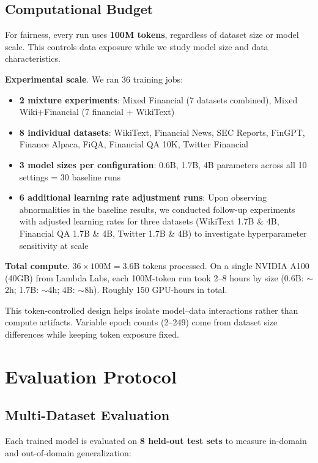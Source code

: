 \subsection{Computational Budget}

For fairness, every run uses \textbf{100M tokens}, regardless of dataset size or model scale. This controls data exposure while we study model size and data characteristics.

\textbf{Experimental scale}. We ran 36 training jobs:
\begin{itemize}
    \item \textbf{2 mixture experiments}: Mixed Financial (7 datasets combined), Mixed Wiki+Financial (7 financial + WikiText)
    \item \textbf{8 individual datasets}: WikiText, Financial News, SEC Reports, FinGPT, Finance Alpaca, FiQA, Financial QA 10K, Twitter Financial
    \item \textbf{3 model sizes per configuration}: 0.6B, 1.7B, 4B parameters across all 10 settings = 30 baseline runs
    \item \textbf{6 additional learning rate adjustment runs}: Upon observing abnormalities in the baseline results, we conducted follow-up experiments with adjusted learning rates for three datasets (WikiText 1.7B \& 4B, Financial QA 1.7B \& 4B, Twitter 1.7B \& 4B) to investigate hyperparameter sensitivity at scale
\end{itemize}

\textbf{Total compute}. $36 \times 100\text{M} = 3.6\text{B}$ tokens processed. On a single NVIDIA A100 (40GB) from Lambda Labs, each 100M-token run took 2--8 hours by size (0.6B: $\sim$2h; 1.7B: $\sim$4h; 4B: $\sim$8h). Roughly 150 GPU-hours in total.

This token-controlled design helps isolate model--data interactions rather than compute artifacts. Variable epoch counts (2--249) come from dataset size differences while keeping token exposure fixed.

\section{Evaluation Protocol}

\subsection{Multi-Dataset Evaluation}

Each trained model is evaluated on \textbf{8 held-out test sets} to measure in-domain and out-of-domain generalization:

